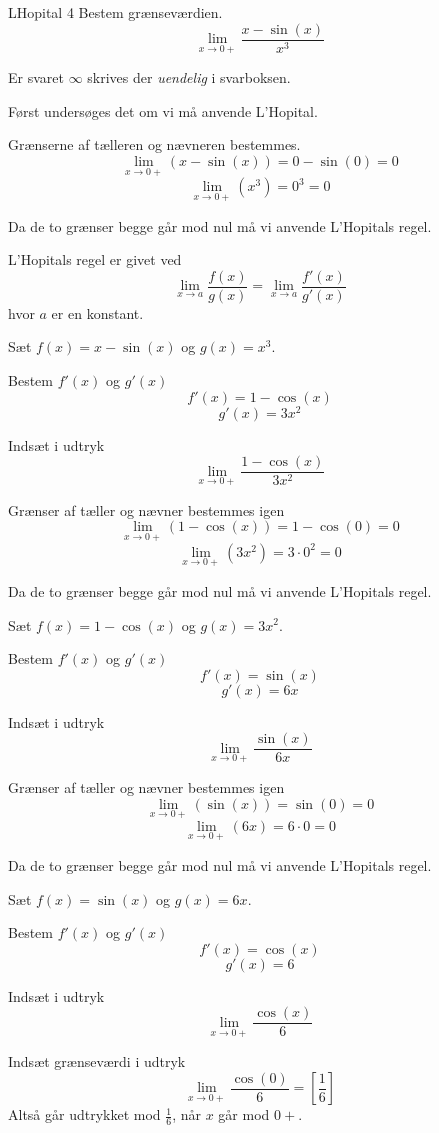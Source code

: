 \documentclass{article}
\begin{document}
\begin{exercise}{LHopital 4}
Bestem grænseværdien.
\[
\lim_{x \to 0+} \frac{x - \sin(x)}{x^3}
\]

Er svaret $\infty$ skrives der \emph{uendelig} i svarboksen.


\hint
Først undersøges det om vi må anvende L'Hopital.

\hint
Grænserne af tælleren og nævneren bestemmes.
\[
\lim_{x \to 0+} (x - \sin(x)) = 0 - \sin(0) = 0
\]
\[
\lim_{x \to 0+} (x^3) = 0^3 = 0
\]

\hint
Da de to grænser begge går mod nul må vi anvende L'Hopitals regel.

\hint
L'Hopitals regel er givet ved
\[
\lim_{x \to a} \frac{f(x)}{g(x)} = \lim_{x \to a} \frac{f'(x)}{g'(x)}
\]
hvor $a$ er en konstant.

\hint
Sæt $f(x) = x - \sin(x)$ og $g(x) = x^3$.

\hint
Bestem $f'(x)$ og $g'(x)$
\[
f'(x) = 1 - \cos(x)
\]
\[
g'(x) = 3x^2
\]

\hint
Indsæt i udtryk
\[
\lim_{x \to 0+} \frac{1 - \cos(x)}{3x^2}
\]

\hint
Grænser af tæller og nævner bestemmes igen
\[
\lim_{x \to 0+} (1 - \cos(x)) = 1 - \cos(0) = 0
\]
\[
\lim_{x \to 0+} (3x^2) = 3 \cdot 0^2 = 0
\]

\hint
Da de to grænser begge går mod nul må vi anvende L'Hopitals regel.

\hint
Sæt $f(x) = 1 - \cos(x)$ og $g(x) = 3x^2$.

\hint
Bestem $f'(x)$ og $g'(x)$
\[
f'(x) = \sin(x)
\]
\[
g'(x) = 6x
\]

\hint
Indsæt i udtryk
\[
\lim_{x \to 0+} \frac{\sin(x)}{6x}
\]

\hint
Grænser af tæller og nævner bestemmes igen
\[
\lim_{x \to 0+} (\sin(x)) = \sin(0) = 0
\]
\[
\lim_{x \to 0+} (6x) = 6 \cdot 0 = 0
\]

\hint
Da de to grænser begge går mod nul må vi anvende L'Hopitals regel.

\hint
Sæt $f(x) = \sin(x)$ og $g(x) = 6x$.

\hint
Bestem $f'(x)$ og $g'(x)$
\[
f'(x) = \cos(x)
\]
\[
g'(x) = 6
\]

\hint
Indsæt i udtryk
\[
\lim_{x \to 0+} \frac{\cos(x)}{6}
\]

\hint
Indsæt grænseværdi i udtryk
\[
\lim_{x \to 0+} \frac{\cos(0)}{6} = \left[ \frac{1}{6} \right]
\]
Altså går udtrykket mod $\frac{1}{6}$, når $x$ går mod $0 + $.

\end{exercise}
\end{document}
